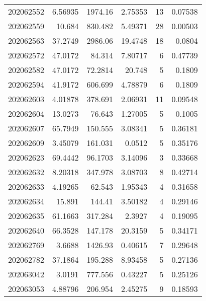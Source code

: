 \begin{tabular}{rrrrrr}
 202062552 &          6.56935 &     1974.16   &            2.75353 &          13 & 0.07538 \\
 202062559 &         10.684   &      830.482  &            5.49371 &          28 & 0.00503 \\
 202062563 &         37.2749  &     2986.06   &           19.4748  &          18 & 0.0804  \\
 202062572 &         47.0172  &       84.314  &            7.80717 &           6 & 0.47739 \\
 202062582 &         47.0172  &       72.2814 &           20.748   &           5 & 0.1809  \\
 202062594 &         41.9172  &      606.699  &            4.78879 &           6 & 0.1809  \\
 202062603 &          4.01878 &      378.691  &            2.06931 &          11 & 0.09548 \\
 202062604 &         13.0273  &       76.643  &            1.27005 &           5 & 0.1005  \\
 202062607 &         65.7949  &      150.555  &            3.08341 &           5 & 0.36181 \\
 202062609 &          3.45079 &      161.031  &            0.0512  &           5 & 0.35176 \\
 202062623 &         69.4442  &       96.1703 &            3.14096 &           3 & 0.33668 \\
 202062632 &          8.20318 &      347.978  &            3.08703 &           8 & 0.42714 \\
 202062633 &          4.19265 &       62.543  &            1.95343 &           4 & 0.31658 \\
 202062634 &         15.891   &      144.41   &            3.50182 &           4 & 0.29146 \\
 202062635 &         61.1663  &      317.284  &            2.3927  &           4 & 0.19095 \\
 202062640 &         66.3528  &      147.178  &           20.3159  &           5 & 0.34171 \\
 202062769 &          3.6688  &     1426.93   &            0.40615 &           7 & 0.29648 \\
 202062782 &         37.1864  &      195.288  &            8.93458 &           5 & 0.27136 \\
 202063042 &          3.0191  &      777.556  &            0.43227 &           5 & 0.25126 \\
 202063053 &          4.88796 &      206.954  &            2.45275 &           9 & 0.18593 \\

\end{tabular}
